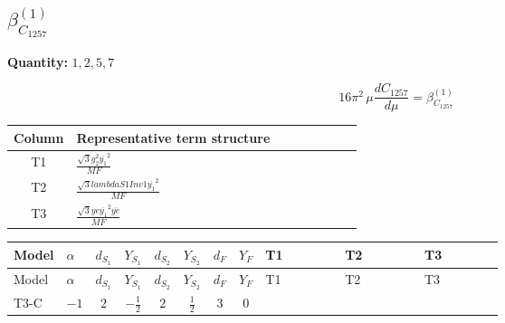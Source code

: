 \documentclass[8pt]{article}
\begin{document}
\begin{landscape}
\section*{$\beta_{C_{1257}}^{(1)}$}
\noindent\textbf{Quantity: }$\mathrm{1,2,5,7}$\par\smallskip
\[16\pi^2\,\mu\frac{d C_{1257}}{d\mu}=\beta_{C_{1257}}^{(1)}\]
\begin{center}
\begin{tabular}{@{}c >{\raggedright\arraybackslash}p{0.82\linewidth}@{}}
\toprule
Column & Representative term structure \\
\midrule
T1 & \(\displaystyle \frac{\sqrt{3} g_{2}^{2} \overline{y_{1}}^{2}}{MF}\) \\
\midrule
T2 & \(\displaystyle \frac{\sqrt{3} lambdaS1Inv1 \overline{y_{1}}^{2}}{MF}\) \\
\midrule
T3 & \(\displaystyle \frac{\sqrt{3} ye \overline{y_{1}}^{2} \overline{ye}}{MF}\) \\
\midrule
\bottomrule
\end{tabular}
\end{center}
\smallskip
\tiny
\begin{longtable}{@{}llcccccc >{\raggedright\arraybackslash}p{0.21\linewidth} >{\raggedright\arraybackslash}p{0.21\linewidth} >{\raggedright\arraybackslash}p{0.21\linewidth}@{}}
\toprule
Model & $\alpha$ & $d_{S_1}$ & $Y_{S_1}$ & $d_{S_2}$ & $Y_{S_2}$ & $d_F$ & $Y_F$ & T1 & T2 & T3 \\
\midrule
\endfirsthead
\toprule
Model & $\alpha$ & $d_{S_1}$ & $Y_{S_1}$ & $d_{S_2}$ & $Y_{S_2}$ & $d_F$ & $Y_F$ & T1 & T2 & T3 \\
\midrule
\endhead
T3-C & $-1$ & $2$ & $-\frac{1}{2}$ & $2$ & $\frac{1}{2}$ & $3$ & $0$ & \scriptsize\adjustbox{max width=\linewidth}{$\begin{gathered} - \frac{\sqrt{3} g_{2}^{2} \overline{y_{1}}^{2}}{8 MF}\end{gathered}$} & \scriptsize\adjustbox{max width=\linewidth}{$\begin{gathered} - \frac{\sqrt{3} lambdaS1Inv1 \overline{y_{1}}^{2}}{12 MF}\end{gathered}$} & \scriptsize\adjustbox{max width=\linewidth}{$\begin{gathered} \frac{\sqrt{3} ye \overline{y_{1}}^{2} \overline{ye}}{24 MF}\end{gathered}$} \\
\midrule
\bottomrule
\end{longtable}
\clearpage

\end{landscape}
\end{document}
